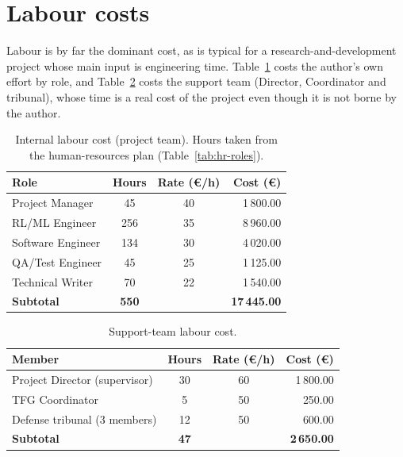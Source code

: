 \section{Labour costs}\label{sec:budget-labor}

Labour is by far the dominant cost, as is typical for a research-and-development project whose
main input is engineering time. Table~\ref{tab:labor-internal} costs the author's own effort by
role, and Table~\ref{tab:labor-support} costs the support team (Director, Coordinator and tribunal),
whose time is a real cost of the project even though it is not borne by the author.

\begin{table}[H]
  \centering
  \caption{Internal labour cost (project team). Hours taken from the human-resources plan
           (Table~\ref{tab:hr-roles}).}
  \label{tab:labor-internal}
  \small
  \begin{tabular}{@{}lccr@{}}
    \toprule
    \textbf{Role} & \textbf{Hours} & \textbf{Rate (€/h)} & \textbf{Cost (€)} \\
    \midrule
    Project Manager   & 45  & 40 & 1\,800.00 \\
    RL/ML Engineer    & 256 & 35 & 8\,960.00 \\
    Software Engineer & 134 & 30 & 4\,020.00 \\
    QA/Test Engineer  & 45  & 25 & 1\,125.00 \\
    Technical Writer  & 70  & 22 & 1\,540.00 \\
    \midrule
    \textbf{Subtotal} & \textbf{550} & & \textbf{17\,445.00} \\
    \bottomrule
  \end{tabular}
\end{table}

\begin{table}[H]
  \centering
  \caption{Support-team labour cost.}
  \label{tab:labor-support}
  \small
  \begin{tabular}{@{}lccr@{}}
    \toprule
    \textbf{Member} & \textbf{Hours} & \textbf{Rate (€/h)} & \textbf{Cost (€)} \\
    \midrule
    Project Director (supervisor) & 30 & 60 & 1\,800.00 \\
    TFG Coordinator               & 5  & 50 & 250.00 \\
    Defense tribunal (3 members)  & 12 & 50 & 600.00 \\
    \midrule
    \textbf{Subtotal} & \textbf{47} & & \textbf{2\,650.00} \\
    \bottomrule
  \end{tabular}
\end{table}

